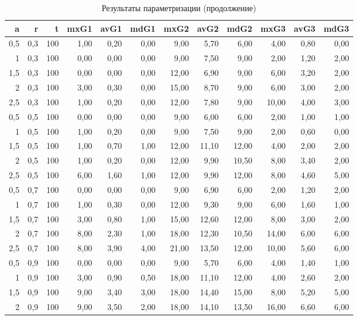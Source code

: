 \begin{table}[h]
\centering
\caption{Результаты параметризации (продолжение)}
\begin{tabular}{|r|r|r|r|r|r|r|r|r|r|r|r|}
\hline
a & r & t & mxG1 & avG1 & mdG1 & mxG2 & avG2 & mdG2 & mxG3 & avG3 & mdG3 \\
\hline
0,5 & 0,3 & 100 & 1,00 & 0,20 & 0,00 & 9,00 & 5,70 & 6,00 & 4,00 & 0,80 & 0,00 \\
1 & 0,3 & 100 & 0,00 & 0,00 & 0,00 & 9,00 & 7,50 & 9,00 & 2,00 & 1,20 & 2,00 \\
1,5 & 0,3 & 100 & 0,00 & 0,00 & 0,00 & 12,00 & 6,90 & 9,00 & 6,00 & 3,20 & 2,00 \\
2 & 0,3 & 100 & 3,00 & 0,30 & 0,00 & 15,00 & 8,70 & 9,00 & 6,00 & 3,00 & 2,00 \\
2,5 & 0,3 & 100 & 1,00 & 0,20 & 0,00 & 12,00 & 7,80 & 9,00 & 10,00 & 4,00 & 3,00 \\
0,5 & 0,5 & 100 & 0,00 & 0,00 & 0,00 & 9,00 & 6,00 & 6,00 & 2,00 & 1,00 & 1,00 \\
1 & 0,5 & 100 & 1,00 & 0,20 & 0,00 & 9,00 & 7,50 & 9,00 & 2,00 & 0,60 & 0,00 \\
1,5 & 0,5 & 100 & 1,00 & 0,70 & 1,00 & 12,00 & 11,10 & 12,00 & 4,00 & 2,00 & 2,00 \\
2 & 0,5 & 100 & 1,00 & 0,20 & 0,00 & 12,00 & 9,90 & 10,50 & 8,00 & 3,40 & 2,00 \\
2,5 & 0,5 & 100 & 6,00 & 1,60 & 1,00 & 12,00 & 9,90 & 12,00 & 8,00 & 4,60 & 5,00 \\
0,5 & 0,7 & 100 & 0,00 & 0,00 & 0,00 & 9,00 & 6,90 & 6,00 & 2,00 & 1,20 & 2,00 \\
1 & 0,7 & 100 & 1,00 & 0,30 & 0,00 & 12,00 & 9,30 & 9,00 & 6,00 & 1,60 & 1,00 \\
1,5 & 0,7 & 100 & 3,00 & 0,80 & 1,00 & 15,00 & 12,60 & 12,00 & 8,00 & 3,00 & 2,00 \\
2 & 0,7 & 100 & 8,00 & 2,30 & 1,00 & 18,00 & 12,30 & 10,50 & 14,00 & 6,00 & 6,00 \\
2,5 & 0,7 & 100 & 8,00 & 3,90 & 4,00 & 21,00 & 13,50 & 12,00 & 10,00 & 5,60 & 6,00 \\
0,5 & 0,9 & 100 & 0,00 & 0,00 & 0,00 & 9,00 & 5,70 & 6,00 & 4,00 & 1,40 & 1,00 \\
1 & 0,9 & 100 & 3,00 & 0,90 & 0,50 & 18,00 & 11,10 & 12,00 & 4,00 & 2,60 & 2,00 \\
1,5 & 0,9 & 100 & 9,00 & 3,40 & 3,00 & 18,00 & 14,40 & 15,00 & 8,00 & 5,20 & 5,00 \\
2 & 0,9 & 100 & 9,00 & 3,50 & 2,00 & 18,00 & 14,10 & 13,50 & 16,00 & 6,60 & 6,00 \\

\end{tabular}
\end{table}
